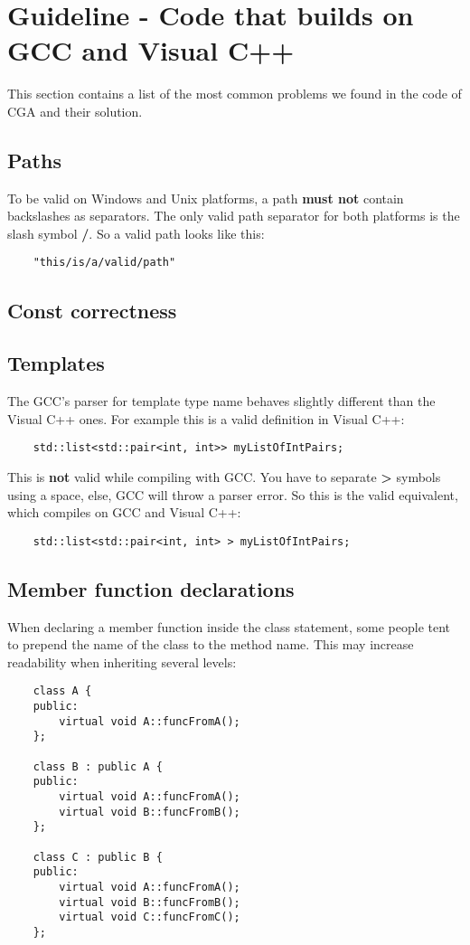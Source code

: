 \section{Guideline - Code that builds on GCC and Visual C++}
This section contains a list of the most common problems we found in the code of CGA and their solution.

\subsection{Paths} To be valid on Windows and Unix platforms, a path \textbf{must not} contain backslashes as separators. The only valid path separator for both platforms is the slash symbol \textbf{/}. So a valid path looks like this: 
\begin{verbatim}
	"this/is/a/valid/path" 
\end{verbatim}

\subsection{Const correctness} 

\subsection{Templates} The GCC's parser for template type name behaves slightly different than the Visual C++ ones. For example this is a valid definition in Visual C++: 
\begin{verbatim}
	std::list<std::pair<int, int>> myListOfIntPairs; 
\end{verbatim}

This is \textbf{not} valid while compiling with GCC. You have to separate \textbf{>} symbols using a space, else, GCC will throw a parser error. So this is the valid equivalent, which compiles on GCC and Visual C++: 
\begin{verbatim}
	std::list<std::pair<int, int> > myListOfIntPairs; 
\end{verbatim}

\subsection{Member function declarations} When declaring a member function inside the class statement, some people tent to prepend the name of the class to the method name. This may increase readability when inheriting several levels:
\begin{verbatim}
    class A {
    public:
        virtual void A::funcFromA();
    };
    
    class B : public A {
    public:
        virtual void A::funcFromA();
        virtual void B::funcFromB();
    };
    
    class C : public B {
    public:
        virtual void A::funcFromA();
        virtual void B::funcFromB();
        virtual void C::funcFromC();
    };
\end{verbatim}

